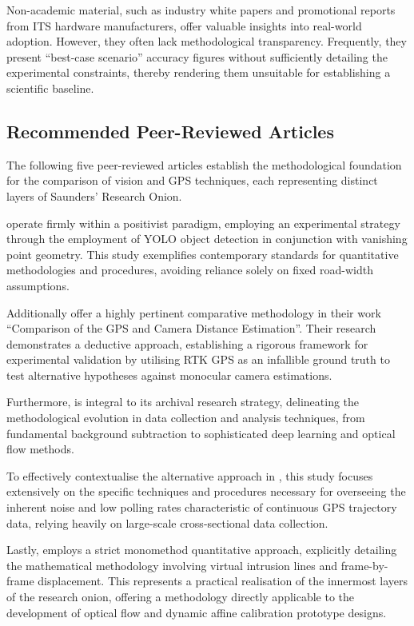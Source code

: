 Non-academic material, such as industry white papers and promotional reports from ITS hardware manufacturers, offer valuable insights into real-world adoption. However, they often lack methodological transparency. Frequently, they present ``best-case scenario'' accuracy figures without sufficiently detailing the experimental constraints, thereby rendering them unsuitable for establishing a scientific baseline.

\subsection{Recommended Peer-Reviewed Articles}
The following five peer-reviewed articles establish the methodological foundation for the comparison of vision and GPS techniques, each representing distinct layers of Saunders' Research Onion. 

\cite{macko2025efficient} operate firmly within a positivist paradigm, employing an experimental strategy through the employment of YOLO object detection in conjunction with vanishing point geometry. This study exemplifies contemporary standards for quantitative methodologies and procedures, avoiding reliance solely on fixed road-width assumptions.

Additionally \cite{arabi2022comparison} offer a highly pertinent comparative methodology in their work ``Comparison of the GPS and Camera Distance Estimation''. Their research demonstrates a deductive approach, establishing a rigorous framework for experimental validation by utilising RTK GPS as an infallible ground truth to test alternative hypotheses against monocular camera estimations.

Furthermore, \cite{fernandez2021vision} is integral to its archival research strategy, delineating the methodological evolution in data collection and analysis techniques, from fundamental background subtraction to sophisticated deep learning and optical flow methods.

To effectively contextualise the alternative approach in \cite{do2024enhanced}, this study focuses extensively on the specific techniques and procedures necessary for overseeing the inherent noise and low polling rates characteristic of continuous GPS trajectory data, relying heavily on large-scale cross-sectional data collection.

Lastly, \cite{rahimi2018vehicle} employs a strict monomethod quantitative approach, explicitly detailing the mathematical methodology involving virtual intrusion lines and frame-by-frame displacement. This represents a practical realisation of the innermost layers of the research onion, offering a methodology directly applicable to the development of optical flow and dynamic affine calibration prototype designs.

